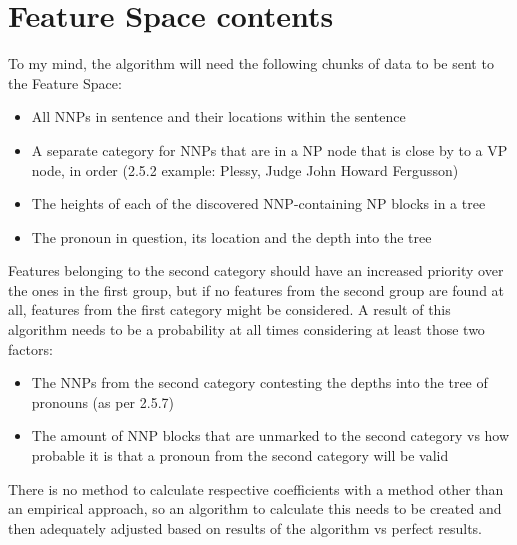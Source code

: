 \documentclass{article}
\begin{document}
\section{Feature Space contents}
To my mind, the algorithm will need the following chunks of data to be sent to the Feature Space:
\begin{itemize}
    \item All NNPs in sentence and their locations within the sentence
    \item A separate category for NNPs that are in a NP node that is close by to a VP node, in order (2.5.2 example: Plessy, Judge John Howard Fergusson)
    \item The heights of each of the discovered NNP-containing NP blocks in a tree
    \item The pronoun in question, its location and the depth into the tree
\end{itemize}
Features belonging to the second category should have an increased priority over the ones in the first group, but if no features from the second group are found at all, features from the first category might be considered. A result of this algorithm needs to be a probability at all times considering at least those two factors:
\begin{itemize}
    \item The NNPs from the second category contesting the depths into the tree of pronouns (as per 2.5.7)
    \item The amount of NNP blocks that are unmarked to the second category vs how probable it is that a pronoun from the second category will be valid
\end{itemize}
There is no method to calculate respective coefficients with a method other than an empirical approach, so an algorithm to calculate this needs to be created and then adequately adjusted based on results of the algorithm vs perfect results.
\end{document}
